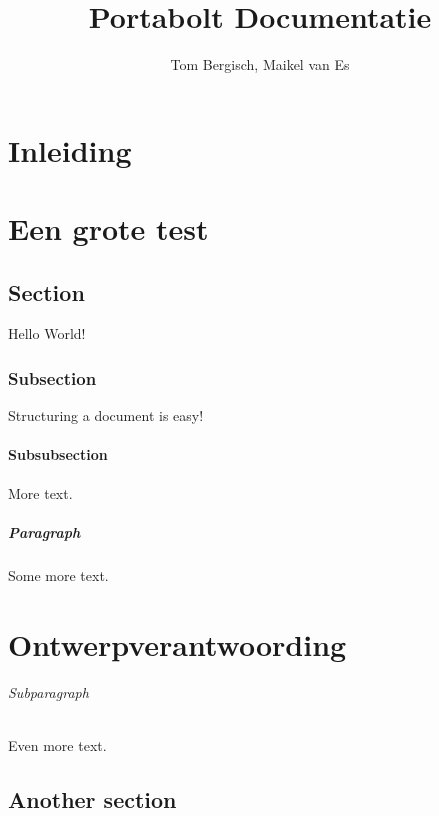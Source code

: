 \documentclass{report}
\title{Portabolt Documentatie}
\author{Tom Bergisch, Maikel van Es}
\begin{document}
  \maketitle
  \newpage 

	\maketitle
	
	\tableofcontents
	
	\chapter{Inleiding}
		\paragraph{}

	 	\paragraph{}
	\chapter{Een grote test}
		\paragraph{}
		


	
	
	\section{Section}
	Hello World!
	\subsection{Subsection}
	Structuring a document is easy!
	\subsubsection{Subsubsection}
	More text.
	\paragraph{Paragraph}
	Some more text.
	\chapter{Ontwerpverantwoording}
	\subparagraph{Subparagraph}
	Even more text.
	\section{Another section}


\begin{abstract}
\end{abstract}
\end{document}
